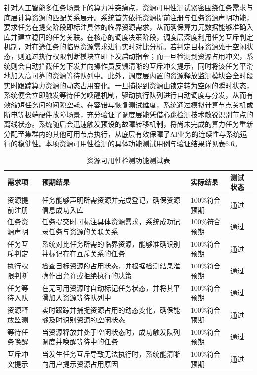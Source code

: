 针对人工智能多任务场景下的算力冲突痛点，资源可用性测试紧密围绕任务需求与底层计算资源的匹配关系展开。系统首先依托资源提前注册与任务资源声明功能，要求任务在提交阶段即标注具体的临界资源需求，从而确保算力元数据能够准确入库并建立稳固的任务关联。在核心的调度决策阶段，调度层深度利用任务互斥判定机制，对在途任务的临界资源需求进行实时对比分析。若判定目标资源处于空闲状态，则通过执行权限判断模块立即下发启动指令；而一旦检测到资源占用冲突，系统则会自动拦截任务下发并向操作员反馈清晰的互斥冲突提示，同时将该任务平滑地加入高可靠的资源等待队列中。此外，调度层内置的资源释放监测模块会全时段实时跟踪算力资源的动态占用变化。一旦捕捉到资源由锁定转为空闲的瞬时状态，系统便会立即触发等待任务唤醒机制，驱动执行队列进行自动调度与分发，从而有效缩短任务间的间隙空耗。在容错与恢复测试维度，系统通过模拟计算节点关机或断电等极端硬件故障场景，充分验证了调度层能凭借心跳检测技术敏锐识别节点的离线状态。系统随后会迅速触发预设的故障转移机制，将尚未完成的算力任务重新分配至集群内的其他可用节点执行，从底层有效保障了AI业务的连续性与系统运行的稳健性。本项资源可用性检测的具体功能测试用例与验证结果详见表6.6。

\begin{table}[htbp]
\centering
\caption{资源可用性检测功能测试表}
\begin{tabularx}{\textwidth}{lXll}
\toprule
\textbf{需求项} & \textbf{预期结果} & \textbf{实际结果} & \textbf{测试状态} \\
\midrule
资源提前注册 & 任务能够声明所需资源并完成登记，确保资源信息成功入库 & 100\%符合预期 & 通过 \\
任务资源声明 & 任务提交时可标注具体资源需求，系统成功记录任务与资源的关联关系 & 100\%符合预期 & 通过 \\
任务互斥判定 & 系统对比任务所需的临界资源，能够准确识别并标记存在互斥关系的任务 & 100\%符合预期 & 通过 \\
执行权限判断 & 检查目标资源的占用状态，并根据检测结果准确作出允许或拒绝执行的决策 & 100\%符合预期 & 通过 \\
任务等待入队 & 在无可用资源时自动标记任务状态，并将其平滑加入资源等待队列中 & 100\%符合预期 & 通过 \\
资源释放监测 & 实时跟踪并捕捉资源占用的动态变化，确保能够及时识别资源的空闲状态 & 100\%符合预期 & 通过 \\
等待任务唤醒 & 当资源释放并处于空闲状态时，成功触发队列调度并唤醒等待中的任务 & 100\%符合预期 & 通过 \\
互斥冲突提示 & 当发生任务互斥导致无法执行时，系统能清晰向用户提示资源占用原因 & 100\%符合预期 & 通过 \\
\bottomrule
\end{tabularx}
\label{tab:resource_availability_test}
\end{table}

